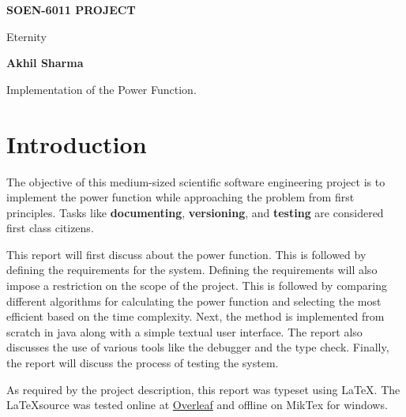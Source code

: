 \documentclass[11pt,a4paper]{report}
\theoremstyle{definition}
\theoremstyle{remark}
\begin{document}
   \begin{titlepage}
        \begin{center}
        \vspace*{1cm}
            
        \Huge
        \textbf{SOEN-6011 PROJECT}
            
        \vspace{0.5cm}
        \LARGE
        Eternity
            
        \vspace{1.5cm}
            
        \textbf{Akhil Sharma}
            
        \vfill
            
        Implementation of the Power Function.
            
        \vspace{15cm}
        \end{center}
    \end{titlepage}
    \tableofcontents
    \clearpage
    
    \section{Introduction}
    The objective of this medium-sized scientific software engineering project is to implement the power function while approaching the problem from first principles. Tasks like \textbf{documenting}, \textbf{versioning}, and \textbf{testing} are considered first class citizens.
    
    \vspace{0.75cm}
    
    This report will first discuss about the power function. This is followed by defining the requirements for the system. Defining the requirements will also impose a restriction on the scope of the project. This is followed by comparing different algorithms for calculating the power function and selecting the most efficient based on the time complexity. Next, the method is implemented from scratch in java along with a simple textual user interface. The report also discusses the use of various tools like the debugger and the type check. Finally, the report will discuss the process of testing the system.
    
    \vspace{0.75cm}
    
    As required by the project description, this report was typeset using \LaTeX . The \LaTeX source was tested online at \href{https://overleaf.com}{Overleaf} and offline on MikTex for windows.
    
\end{document}
